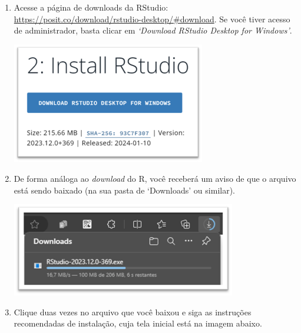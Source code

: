 \documentclass[
  letterpaper,
  DIV=11,
  numbers=noendperiod]{scrreprt}
\begin{document}
\begin{enumerate}
\def\labelenumi{\arabic{enumi}.}
\item
  Acesse a página de downloads da RStudio:
  \url{https://posit.co/download/rstudio-desktop/\#download}. Se você
  tiver acesso de administrador, basta clicar em \emph{`Download RStudio
  Desktop for Windows'}.

  \begin{center}
  \includegraphics[width=3.32292in,height=\textheight]{images/clipboard-2426047081.png}
  \end{center}
\item
  De forma análoga ao \emph{download} do R, você receberá um aviso de
  que o arquivo está sendo baixado (na sua pasta de `Downloads' ou
  similar).

  \begin{center}
  \includegraphics[width=3.85417in,height=\textheight]{images/clipboard-3795362132.png}
  \end{center}
\item
  Clique duas vezes no arquivo que você baixou e siga as instruções
  recomendadas de instalação, cuja tela inicial está na imagem abaixo.


\end{enumerate}
\end{document}

